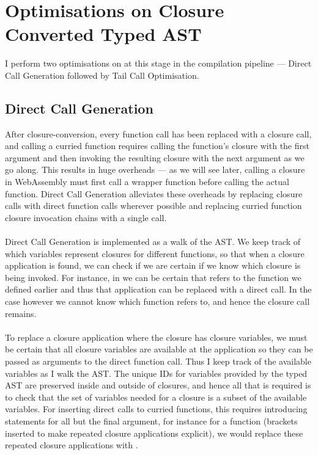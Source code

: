 \section{Optimisations on Closure Converted Typed AST}
I perform two optimisations on at this stage in the compilation pipeline --- Direct Call Generation followed by Tail Call Optimisation.

\subsection{Direct Call Generation}
After closure-conversion, every function call has been replaced with a closure call, and calling a curried function requires calling the function's closure with the first argument and then invoking the resulting closure with the next argument as we go along. This results in huge overheads --- as we will see later, calling a closure in WebAssembly must first call a wrapper function before calling the actual function. Direct Call Generation alleviates these overheads by replacing closure calls with direct function calls wherever possible and replacing curried function closure invocation chains with a single call.
\\\\
Direct Call Generation is implemented as a walk of the AST. We keep track of which variables represent closures for different functions, so that when a closure application is found, we can check if we are certain if we know which closure is being invoked. For instance, in  we can be certain that  refers to the function we defined earlier and thus that application can be replaced with a direct call. In the case  however we cannot know which function  refers to, and hence the closure call remains.
\\\\
To replace a closure application where the closure has closure variables, we must be certain that all closure variables are available at the application so they can be passed as arguments to the direct function call. Thus I keep track of the available variables as I walk the AST. The unique IDs for variables provided by the typed AST are preserved inside and outside of closures, and hence all that is required is to check that the set of variables needed for a closure is a subset of the available variables. For inserting direct calls to curried functions, this requires introducing  statements for all but the final argument, for instance for a function  (brackets inserted to make repeated closure applications explicit), we would replace these repeated closure applications with .

